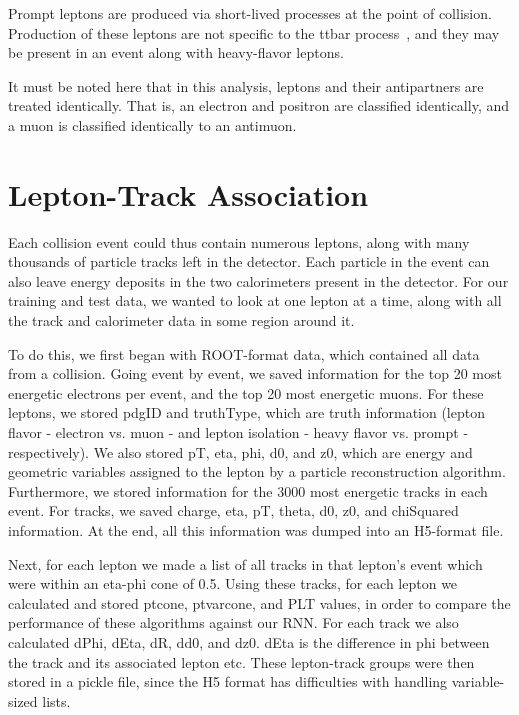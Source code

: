 Prompt leptons are produced via short-lived processes at the point of collision. Production of these leptons are not specific to the ttbar process~\cite{bodek}, and they may be present in an event along with heavy-flavor leptons.

It must be noted here that in this analysis, leptons and their antipartners are treated identically. That is, an electron and positron are classified identically, and a muon is classified identically to an antimuon.


\section{Lepton-Track Association}


Each collision event could thus contain numerous leptons, along with many thousands of particle tracks left in the detector. Each particle in the event can also leave energy deposits in the two calorimeters present in the detector. For our training and test data, we wanted to look at one lepton at a time, along with all the track and calorimeter data in some region around it.

To do this, we first began with ROOT-format data, which contained all data from a collision. Going event by event, we saved information for the top 20 most energetic electrons per event, and the top 20 most energetic muons. For these leptons, we stored pdgID and truthType, which are truth information (lepton flavor - electron vs. muon - and lepton isolation - heavy flavor vs. prompt - respectively). We also stored pT, eta, phi, d0, and z0, which are energy and geometric variables assigned to the lepton by a particle reconstruction algorithm. Furthermore, we stored information for the 3000 most energetic tracks in each event. For tracks, we saved charge, eta, pT, theta, d0, z0, and chiSquared information. At the end, all this information was dumped into an H5-format file.

Next, for each lepton we made a list of all tracks in that lepton's event which were within an eta-phi cone of 0.5. Using these tracks, for each lepton we calculated and stored ptcone, ptvarcone, and PLT values, in order to compare the performance of these algorithms against our RNN. For each track we also calculated dPhi, dEta, dR, dd0, and dz0. dEta is the difference in phi between the track and its associated lepton etc. These lepton-track groups were then stored in a pickle file, since the H5 format has difficulties with handling variable-sized lists.


